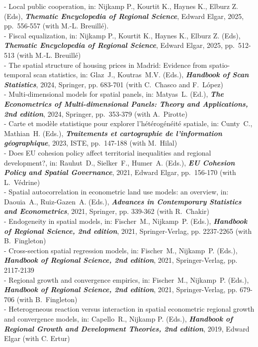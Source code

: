 \documentclass[a4paper,12pt]{article}
\begin{document}
\noindent 
- Local public cooperation, in: Nijkamp P., Kourtit K., Haynes K., Elburz Z. (Eds), \textit{\textbf{Thematic Encyclopedia of Regional Science}}, Edward Elgar, 2025, pp.~556-557 (with M.-L. Breuillé). \\
- Fiscal equalization, in: Nijkamp P., Kourtit K., Haynes K., Elburz Z. (Eds), \textit{\textbf{Thematic Encyclopedia of Regional Science}},  Edward Elgar, 2025, pp.~512-513 (with M.-L. Breuillé) \\
- The spatial structure of housing prices in Madrid: Evidence from spatio-temporal scan statistics, in: Glaz~J., Koutras~M.V. (Eds.), \textit{\textbf{Handbook of Scan Statistics}}, 2024, Springer, pp. 683-701 (with C.~Chasco and F.~López) \\
- Multi-dimensional models for spatial panels, in: Matyas~L. (Ed.), \textit{\textbf{The Econometrics of Multi-dimensional Panels: Theory and Applications, 2nd edition}}, 2024, Springer, pp.~353-379 (with A.~Pirotte) \\
- Carte et modèle statistique pour explorer l'hétérogénéité spatiale, in: Cunty~C., Mathian~H. (Eds.), \textit{\textbf{Traitements et cartographie de l'information géographique}}, 2023, ISTE, pp.~147-188 (with M.~Hilal) \\
- Does EU cohesion policy affect territorial inequalities and regional development?, in: Rauhut~D., Sielker~F., Humer~A. (Eds.), \textit{\textbf{EU Cohesion Policy and Spatial Governance}}, 2021, Edward Elgar, pp.~156-170  (with L.~Védrine) \\
- Spatial autocorrelation in econometric land use models: an overview, in: Daouia~A., Ruiz-Gazen~A. (Eds.), \textit{\textbf{Advances in Contemporary Statistics and Econometrics}}, 2021, Springer, pp. 339-362 (with R.~Chakir) \\
- Endogeneity in spatial models, in: Fischer~M., Nijkamp~P. (Eds.), \textit{\textbf{Handbook of Regional Science, 2nd edition}}, 2021, Springer-Verlag, pp. 2237-2265 (with B.~Fingleton) \\
- Cross-section spatial regression models, in: Fischer~M., Nijkamp~P. (Eds.), \textit{\textbf{Handbook of Regional Science, 2nd edition}}, 2021, Springer-Verlag, pp. 2117-2139 \\
- Regional growth and convergence empirics, in: Fischer~M., Nijkamp~P. (Eds.), \textit{\textbf{Handbook of Regional Science, 2nd edition}}, 2021, Springer-Verlag, pp. 679-706 (with B.~Fingleton) \\
- Heterogeneous reaction versus interaction in spatial econometric regional growth and convergence models, in: Capello~R., Nijkamp P. (Eds.), \textit{\textbf{Handbook of Regional Growth and Development Theories, 2nd edition}}, 2019, Edward Elgar (with C. Ertur) \\
\end{document}
